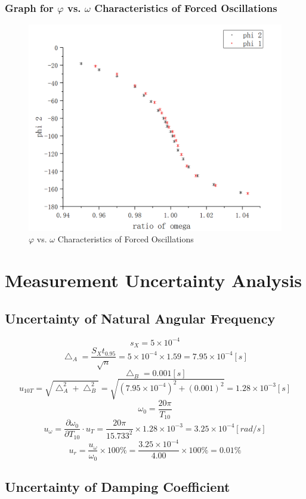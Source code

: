 \documentclass[12pt]{article}
\begin{document}
\subsubsection{Graph for $\varphi$ vs. $\omega$ Characteristics of Forced Oscillations}
\begin{figure}[H]
\centering
\includegraphics[scale=0.35]{P6.jpg}
\caption{ $\varphi$ vs. $\omega$ Characteristics of Forced Oscillations}
\end{figure}
\section{Measurement Uncertainty Analysis}
\subsection{Uncertainty of Natural Angular Frequency}
$$s_X=5\times10^{-4}$$
$$\bigtriangleup_A=\frac{S_Xt_{0.95}}{\sqrt{n}}=5\times10^{-4}\times1.59=7.95\times10^{-4}[s]$$
$$\bigtriangleup_B=0.001[s]$$
$$u_{10T}=\sqrt{\bigtriangleup_A^2+\bigtriangleup_B^2}=\sqrt{(7.95\times10^{-4}	)^2+(0.001)^2}=1.28\times10^{-3}[s]$$
$$\omega_0=\frac{20\pi}{T_{10}}$$
$$u_{\omega}=\frac{\partial{\omega_0}}{\partial{T_{10}}}\cdot u_T=\frac{20\pi}{15.733^2}\times1.28\times10^{-3}=3.25\times10^{-4}[rad/s]$$
$$u_r=\frac{u_{\omega}}{\omega_0}\times100\%=\frac{3.25\times10^{-4}}{4.00}\times100\%=0.01\%$$
\subsection{Uncertainty of Damping Coefficient}
\end{document}
